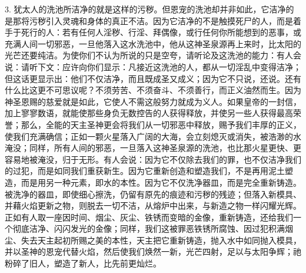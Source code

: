 3. 犹太人的洗池所洁净的就是这样的污秽。但恩宠的洗池却并非如此，它洁净的是那将污秽引入灵魂和身体的真正不洁。因为它洁净的不是触摸死尸的人，而是着手于死行的人：若有任何人淫秽、行淫、拜偶像，或行任何你所能想到的恶事，或充满人间一切邪恶，一旦他落入这水洗池中，他从这神圣泉源再上来时，比太阳的光芒还要纯洁。为使你们不认为所说的只是空夸，请听论及这洗池的能力：有人会说：请听下文：应许向你们显示：凡接近这洗池的人，都从一切淫乱中变得洁净；但这话更显示出：他们不仅洁净，而且既成圣又成义；因为它不只说，还说。还有什么比这更不可思议呢？不须劳苦、不须奋斗、不须善行，而正义油然而生。因为神圣恩赐的慈爱就是如此，它使人不需这般努力就成为义人。如果皇帝的一封信，加上寥寥数语，就能使那些身负无数控告的人获得释放，并使另一些人获得最高荣誉；那么，全能的天主圣神更会将我们从一切邪恶中释放，赐予我们丰厚的正义，使我们充满确信；正如一颗火星落入广阔的大海，会立刻熄灭或消失，被浩渺的水淹没；同样，所有人间的邪恶，一旦落入这神圣泉源的洗池，也比那火星更快、更容易地被淹没，归于无形。有人会说：因为它不仅除去我们的罪，也不仅洁净我们的过犯，而是如同我们重获新生。因为它重新创造和塑造我们，不是再用泥土塑造，而是用另一种元素，即水的本性。因为它不仅洗净器皿，而是完全重新铸造。被洗净的器皿，即使细心擦洗，仍留有原先的痕迹和污秽的残迹；但落入新模具、并藉火焰更新之物，则脱去一切不洁，从熔炉中出来，与新造之物一样闪耀光辉。正如有人取一座因时间、烟尘、灰尘、铁锈而变暗的金像，重新铸造，还给我们一个彻底洁净、闪闪发光的金像；同样，我们这被罪恶铁锈所腐蚀、因过犯积满烟尘、失去天主起初所赐之美的本性，天主把它重新铸造，抛入水中如同抛入模具，并以圣神的恩宠代替火焰，然后使我们焕然一新，光芒四射，足以与太阳争辉；祂粉碎了旧人，塑造了新人，比先前更灿烂。\par

